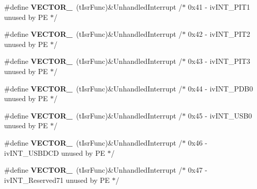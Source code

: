 \begin{DoxyCompactItemize}
\item 
\#define {\bfseries V\+E\+C\+T\+O\+R\+\_}~(t\+Isr\+Func)\&Unhandled\+Interrupt         /$\ast$ 0x41 -\/    iv\+I\+N\+T\+\_\+\+P\+I\+T1                     unused by P\+E $\ast$/\hypertarget{group___vectors___config__module_ga2c788ce07ad4c2bb87c3b968880ff638}{}\label{group___vectors___config__module_ga2c788ce07ad4c2bb87c3b968880ff638}

\item 
\#define {\bfseries V\+E\+C\+T\+O\+R\+\_}~(t\+Isr\+Func)\&Unhandled\+Interrupt         /$\ast$ 0x42 -\/    iv\+I\+N\+T\+\_\+\+P\+I\+T2                     unused by P\+E $\ast$/\hypertarget{group___vectors___config__module_gac5de241da923d15c094be7e8e6a6324b}{}\label{group___vectors___config__module_gac5de241da923d15c094be7e8e6a6324b}

\item 
\#define {\bfseries V\+E\+C\+T\+O\+R\+\_}~(t\+Isr\+Func)\&Unhandled\+Interrupt         /$\ast$ 0x43 -\/    iv\+I\+N\+T\+\_\+\+P\+I\+T3                     unused by P\+E $\ast$/\hypertarget{group___vectors___config__module_ga49210ab54714e44c3df038c6fb8bacc8}{}\label{group___vectors___config__module_ga49210ab54714e44c3df038c6fb8bacc8}

\item 
\#define {\bfseries V\+E\+C\+T\+O\+R\+\_}~(t\+Isr\+Func)\&Unhandled\+Interrupt         /$\ast$ 0x44 -\/    iv\+I\+N\+T\+\_\+\+P\+D\+B0                     unused by P\+E $\ast$/\hypertarget{group___vectors___config__module_ga643f6e6de7094db948ac3b7598f9fe39}{}\label{group___vectors___config__module_ga643f6e6de7094db948ac3b7598f9fe39}

\item 
\#define {\bfseries V\+E\+C\+T\+O\+R\+\_}~(t\+Isr\+Func)\&Unhandled\+Interrupt         /$\ast$ 0x45 -\/    iv\+I\+N\+T\+\_\+\+U\+S\+B0                     unused by P\+E $\ast$/\hypertarget{group___vectors___config__module_ga24d79840592c57bea150a9d1c2737e92}{}\label{group___vectors___config__module_ga24d79840592c57bea150a9d1c2737e92}

\item 
\#define {\bfseries V\+E\+C\+T\+O\+R\+\_}~(t\+Isr\+Func)\&Unhandled\+Interrupt         /$\ast$ 0x46 -\/    iv\+I\+N\+T\+\_\+\+U\+S\+B\+D\+C\+D                   unused by P\+E $\ast$/\hypertarget{group___vectors___config__module_gaf6d9665e333fe9f92e89582cc21f2651}{}\label{group___vectors___config__module_gaf6d9665e333fe9f92e89582cc21f2651}

\item 
\#define {\bfseries V\+E\+C\+T\+O\+R\+\_}~(t\+Isr\+Func)\&Unhandled\+Interrupt         /$\ast$ 0x47 -\/    iv\+I\+N\+T\+\_\+\+Reserved71               unused by P\+E $\ast$/\hypertarget{group___vectors___config__module_ga3aef7583d550c502a3de238d739db1fd}{}\label{group___vectors___config__module_ga3aef7583d550c502a3de238d739db1fd}


\end{DoxyCompactItemize}
